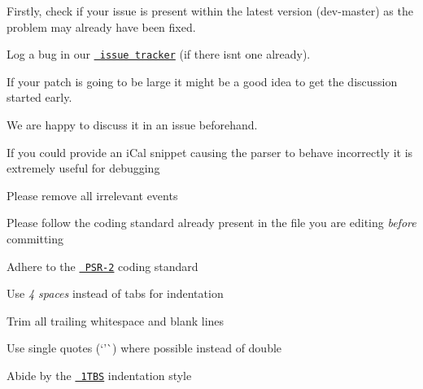 \begin{DoxyEnumerate}
\item Firstly, check if your issue is present within the latest version ({\ttfamily dev-\/master}) as the problem may already have been fixed.
\end{DoxyEnumerate}
\begin{DoxyEnumerate}
\item Log a bug in our \href{https://github.com/u01jmg3/ics-parser/issues}{\texttt{ issue tracker}} (if there isn\textquotesingle{}t one already).
\begin{DoxyItemize}
\item If your patch is going to be large it might be a good idea to get the discussion started early.
\begin{DoxyItemize}
\item We are happy to discuss it in an issue beforehand.
\end{DoxyItemize}
\item If you could provide an i\+Cal snippet causing the parser to behave incorrectly it is extremely useful for debugging
\begin{DoxyItemize}
\item Please remove all irrelevant events
\end{DoxyItemize}
\end{DoxyItemize}
\end{DoxyEnumerate}
\begin{DoxyEnumerate}
\item Please follow the coding standard already present in the file you are editing {\itshape before} committing
\begin{DoxyItemize}
\item Adhere to the \href{https://github.com/php-fig/fig-standards/blob/master/accepted/PSR-2-coding-style-guide.md}{\texttt{ PSR-\/2}} coding standard
\item Use {\itshape 4 spaces} instead of tabs for indentation
\item Trim all trailing whitespace and blank lines
\item Use single quotes (`'\`{}) where possible instead of double
\item Abide by the \href{https://en.wikipedia.org/wiki/Indent_style\#Variant:_1TBS_.28OTBS.29}{\texttt{ 1TBS}} indentation style 
\end{DoxyItemize}
\end{DoxyEnumerate}